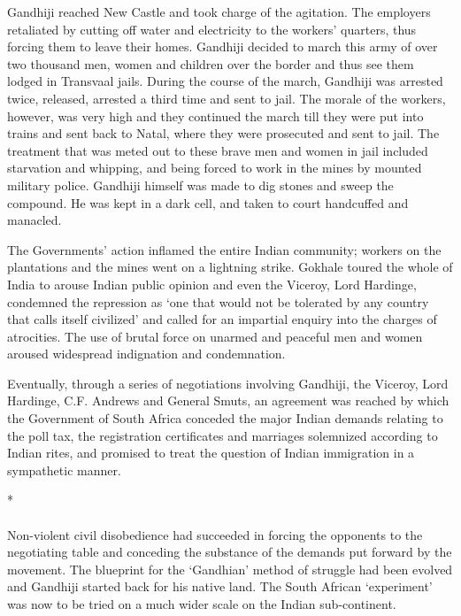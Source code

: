 Gandhiji reached New Castle and took charge of the agitation. The employers retaliated by cutting off water and electricity to the workers' quarters, thus forcing them to leave their homes. Gandhiji decided to march this army of over two thousand men, women and children over the border and thus see them lodged in Transvaal jails. During the course of the march, Gandhiji was arrested twice, released, arrested a third time and sent to jail. The morale of the workers, however, was very high and they continued the march till they were put into trains and sent back to Natal, where they were prosecuted and sent to jail. The treatment that was meted out to these brave men and women in jail included starvation and whipping, and being forced to work in the mines by mounted military police. Gandhiji himself was made to dig stones and sweep the compound. He was kept in a dark cell, and taken to court handcuffed and manacled.

The Governments' action inflamed the entire Indian community; workers on the plantations and the mines went on a lightning strike. Gokhale toured the whole of India to arouse Indian public opinion and even the Viceroy, Lord Hardinge, condemned the repression as `one that would not be tolerated by any country that calls itself civilized' and called for an impartial enquiry into the charges of atrocities. The use of brutal force on unarmed and peaceful men and women aroused widespread indignation and condemnation.

Eventually, through a series of negotiations involving Gandhiji, the Viceroy, Lord Hardinge, C.F. Andrews and General Smuts, an agreement was reached by which the Government of South Africa conceded the major Indian demands relating to the poll tax, the registration certificates and marriages solemnized according to Indian rites, and promised to treat the question of Indian immigration in a sympathetic manner.

\begin{center}*\end{center}

\paragraph*{}


Non-violent civil disobedience had succeeded in forcing the opponents to the negotiating table and conceding the substance of the demands put forward by the movement. The blueprint for the `Gandhian' method of struggle had been evolved and Gandhiji started back for his native land. The South African `experiment' was now to be tried on a much wider scale on the Indian sub-continent.

